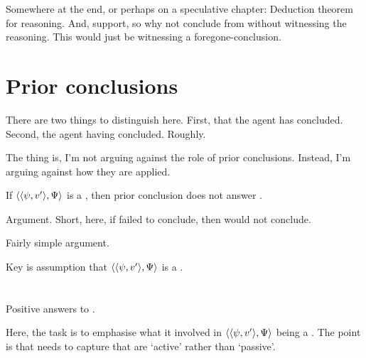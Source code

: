 \begin{note}
  Somewhere at the end, or perhaps on a speculative chapter:
  Deduction theorem for reasoning.
  And, support, so why not conclude from without witnessing the reasoning.
  This would just be witnessing a foregone-conclusion.
\end{note}

\section{Prior conclusions}
\label{cha:fcs:sec:prior-conclusions}

\begin{note}
  There are two things to distinguish here.
  First, that the agent has concluded.
  Second, the agent having concluded.
  Roughly.

  The thing is, I'm not arguing against the role of prior conclusions.
  Instead, I'm arguing against how they are applied.
\end{note}

\begin{note}
  \begin{proposition}
    If \(\langle \langle \psi, v' \rangle, \Psi \rangle\) is a \requ{}, then prior conclusion does not answer \qzS{}.
  \end{proposition}

  Argument.
  Short, here, if failed to conclude, then would not conclude.
\end{note}

\begin{note}
  Fairly simple argument.

  Key is assumption that \(\langle \langle \psi, v' \rangle, \Psi \rangle\) is a \requ{}.
\end{note}

\section{}
\label{cha:fcs:sec:fc}

\begin{note}
  Positive answers to \qzS{}.

  Here, the task is to emphasise what it involved in \(\langle \langle \psi, v' \rangle, \Psi \rangle\) being a \fc{}.
  The point is that \fc{} needs to capture that \fc{} are `active' rather than `passive'.
\end{note}


